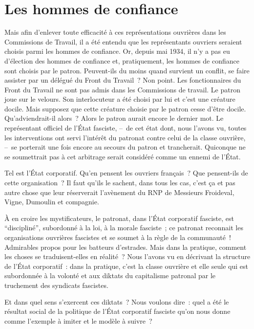 \documentclass[french,twoside]{book} %
\begin{document}
\section[{Les hommes de confiance}]{Les hommes de confiance}
\noindent Mais afin d’enlever toute efficacité à ces représentations ouvrières dans les Commissions de Travail, il a été entendu que les représentants ouvriers seraient choisis parmi les hommes de confiance. Or, depuis mai 1934, il n’y a pas eu d’élection des hommes de confiance et, pratiquement, les hommes de confiance sont choisis par le patron. Peuvent-ils du moins quand survient un conflit, se faire assister par un délégué du Front du Travail ? Non point. Les fonctionnaires du Front du Travail ne sont pas admis dans les Commissions de travail. Le patron joue sur le velours. Son interlocuteur a été choisi par lui et c’est une créature docile. Mais supposez que cette créature choisie par le patron cesse d’être docile. Qu’adviendrait-il alors ? Alors le patron aurait encore le dernier mot. Le représentant officiel de l’État fasciste, – de cet état dont, nous l’avons vu, toutes les interventions ont servi l’intérêt du patronat contre celui de la classe ouvrière, – se porterait une fois encore au secours du patron et trancherait. Quiconque ne se soumettrait pas à cet arbitrage serait considéré comme un ennemi de l’État.\par
Tel est l’État corporatif. Qu’en pensent les ouvriers français ? Que pensent-ils de cette organisation ? Il faut qu’ils le sachent, dans tous les cas, c’est ça et pas autre chose que leur réserverait l’avènement du RNP de Messieurs Froideval, Vigne, Dumoulin et compagnie.\par
À en croire les mystificateurs, le patronat, dans l’État corporatif fasciste, est “discipliné”, subordonné à la loi, à la morale fasciste ; ce patronat reconnait les organisations ouvrières fascistes et se soumet à la règle de la communauté ! Admirables propos pour les batteurs d’estrades. Mais dans la pratique, comment les choses se traduisent-elles en réalité ? Nous l’avons vu en décrivant la structure de l’État corporatif : dans la pratique, c’est la classe ouvrière et elle seule qui est subordonnée à la volonté et aux diktats du capitalisme patronal par le truchement des syndicats fascistes.\par
Et dans quel sens s’exercent ces diktats ? Nous voulons dire : quel a été le résultat social de la politique de l’État corporatif fasciste qu’on nous donne comme l’exemple à imiter et le modèle à suivre ?
\end{document}
